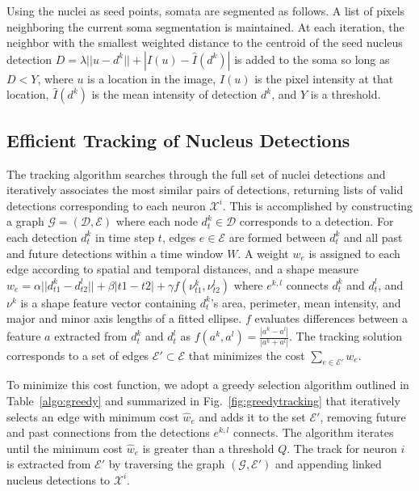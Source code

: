 Using  the nuclei  as  seed points,   somata are  segmented as follows. 
A list of  pixels neighboring the
current  soma  segmentation is  maintained.   At  each iteration,  the
neighbor with  the smallest weighted  distance to the centroid  of the
seed  nucleus  detection  $D  =  \lambda  ||  u  -  d^k||  +  |I(u)  -
\hat{I}(d^k)|$ is added to the soma so long as $D < Y$, where $u$ is a
location  in the  image,  $I(u)$  is  the pixel  intensity at  that
location, $\hat{I}(d^k)$ is the mean intensity of detection $d^k$, and
$Y$ is a threshold.


\vspace{-3mm}
\subsection{Efficient Tracking of Nucleus Detections}
\label{sec:tracking}
\vspace{-2mm}

The tracking algorithm searches through the full set of nuclei detections
and iteratively associates the most similar  pairs of detections, returning
lists of valid detections corresponding to each neuron $\mathcal{X}^i$.
This is accomplished by constructing a graph 
$\mathcal{G}=(\mathcal{D},\mathcal{E})$  where each
node $d^k_t  \in \mathcal{D}$  corresponds to  a detection. 
For each detection $d^k_t$ in time step $t$, edges $e \in \mathcal{E}$ are formed between
$d^k_t$ and all past and future detections within a time window $W$.
A weight $w_e$ is assigned to each edge according to spatial and 
temporal distances, and a shape measure 
$w_{e} = \alpha || d^k_{t1} - d^l_{t2} ||
+ \beta |t1 - t2| + \gamma f(\nu^k_{t1}, \nu^l_{t2})$
where $e^{k,l}$ connects  $d^k_t$ and $d^l_t$, and $\nu^k$  is a shape
feature vector  containing $d^k_t$'s area,  perimeter, mean intensity,
and major  and minor axis lengths  of a fitted  ellipse. $f$ evaluates
differences between  a feature $a$ extracted from  $d^k_t$ and $d^l_t$
as  $f(a^k,a^l) =  \frac{|a^k  - a^l|}{|a^k  +  a^l|}$.  The  tracking
solution  corresponds   to  a  set  of   edges  $\mathcal{E'}  \subset
\mathcal{E}$ that minimizes the cost $\sum_{e \in \mathcal{E'}} w_e$.

To minimize this cost function,  we adopt a greedy selection algorithm
outlined     in    Table~\ref{algo:greedy}    and     summarized    in
Fig.~\ref{fig:greedytracking}  that iteratively  selects an  edge with
minimum  cost  $\hat w_e$  and  adds  it  to the  set  $\mathcal{E}'$,
removing  future   and  past   connections  from  the   detections  $e^{k,l}$
connects. The algorithm iterates until  the minimum cost $\hat w_e$ is
greater than  a threshold $Q$. The  track for neuron  $i$ is extracted
from       $\mathcal{E}'$      by      traversing       the      graph
$(\mathcal{G},\mathcal{E}')$  and appending linked  nucleus detections
to $\mathcal{X}^i$.




